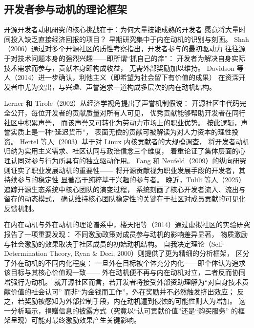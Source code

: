 \documentclass[
    type = master, %
    degree = professional,        %
    decl-page,  %
    twoside,                %
    fontset = fandol %
  ]{njuthesis}
\begin{document}
\subsection{开发者参与动机的理论框架}

开源开发者动机研究的核心挑战在于：为何大量技能成熟的开发者
愿意将大量时间投入缺乏直接经济回报的项目？
早期研究集中于内在动机的识别与刻画。
Shah（2006）通过对多个开源社区的质性考察指出，开发者参与的最初驱动力
往往源于对技术问题本身的强烈兴趣——即所谓“抓自己的痒”：
开发者为解决自身实际技术需求而参与，贡献本身即构成收益，
无需外部奖励加以维持\cite{shah2006motivation}。
Davidson 等人（2014）进一步确认，利他主义（即希望为社会留下有价值的成果）
在资深开发者中尤为突出，与兴趣、声誉追求一道构成多层次的内在动机结构\cite{davidson2014older}。

Lerner 和 Tirole（2002）从经济学视角提出了声誉机制假说：
开源社区中代码完全公开，每位开发者的贡献质量对所有人可见，
优秀贡献能够帮助开发者在同行社区中积累声誉，
而该声誉又可转化为劳动力市场上的职业优势\cite{lerner2002simple}。
按此逻辑，声誉实质上是一种“延迟货币”，
表面无偿的贡献可被解读为对人力资本的理性投资。
Hertel 等人（2003）基于对 Linux 内核贡献者的大规模调查，
将开发者动机归纳为实用主义需求、社区认同与政治信念三个维度，
着重论证了集体层面的心理认同对参与行为所具有的独立驱动作用\cite{hertel2003motivation}。
Fang 和 Neufeld（2009）的纵向研究则证实了职业发展动机的重要性——
将开源贡献视为职业发展手段的开发者，其持续参与的稳定性
显著高于纯粹基于兴趣的参与者\cite{fang2009understanding}。
晚近，Tulili 等人（2025）追踪开源生态系统中核心团队的演变过程，
系统刻画了核心开发者流入、流出与留存的动态模式，
确认维持核心团队稳定性的关键在于社区对成员贡献的可见化反馈机制\cite{tulili2025exploring}。

在内在动机与外在动机的理论谱系中，楼天阳等（2014）通过虚拟社区的实验研究报告了一项重要发现：
不同激励政策对成员参与动机的影响差异显著，
物质激励与社会激励的效果取决于社区成员的初始动机结构\cite{lou2014incentive}。
自我决定理论（Self-Determination Theory, Ryan \& Deci, 2000）\cite{ryan2000self}则提供了更为精细的分析框架，
区分了外在动机的不同内化程度：
一旦外在目标被个体充分内化——即个体认为追求该目标与其核心价值观一致——
外在动机便不再与内在动机对立，二者反而协同增强行为动机。
就开源社区而言，若开发者将接受外部资助理解为“对自身技术贡献价值的社会认可”
而非“为金钱而工作”，外在奖励并不必然触发挤出效应；
反之，若奖励被感知为外部控制手段，内在动机遭到侵蚀的可能性则大为增加。
这一分析暗示，捐赠信息的披露方式（究竟以“认可贡献价值”还是“购买服务”
的框架呈现）可能对最终激励效果产生关键影响\cite{benabou2003intrinsic}。
\end{document}
